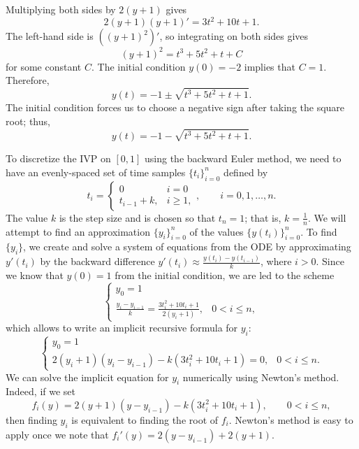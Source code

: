 \documentclass{homework}
\begin{document}
	\begin{arabicparts}
		\questionpart Multiplying both sides by $2(y+1)$ gives
		\begin{equation}
			2(y+1)(y+1)' = 3t^2+10t+1.
		\end{equation}
		The left-hand side is $\left((y+1)^2\right)'$, so integrating on both sides gives
		\begin{equation}
			(y+1)^2 = t^3+5t^2+t+C
		\end{equation}
		for some constant $C$. The initial condition $y(0) = -2$ implies that $C = 1$. Therefore,
		\begin{equation}
			y(t) = -1 \pm \sqrt{t^3+5t^2+t+1}.
		\end{equation}
		The initial condition forces us to choose a negative sign after taking the square root; thus,
		\begin{equation}
			y(t) = -1 - \sqrt{t^3+5t^2+t+1}.
		\end{equation}
		
		\questionpart To discretize the IVP on $[0,1]$ using the backward Euler method, we need to have an evenly-spaced set of time samples $\{t_i\}_{i=0}^n$ defined by
		\begin{equation}
			t_i = \begin{cases}
				0 & i = 0 \\
				t_{i-1} + k, & i \ge 1,
			\end{cases}, \qquad i = 0,1,\dots,n.
		\end{equation}
		The value $k$ is the step size and is chosen so that $t_n = 1$; that is, $k = \frac{1}{n}$. We will attempt to find an approximation $\{y_i\}_{i=0}^n$ of the values $\{y(t_i)\}_{i=0}^n$. To find $\{y_i\}$, we create and solve a system of equations from the ODE by approximating $y'(t_i)$ by the backward difference $y'(t_i) \approx \frac{y(t_i) - y(t_{i-1})}{k}$, where $i > 0$. Since we know that $y(0) = 1$ from the initial condition, we are led to the scheme
		\begin{equation}
			\begin{cases}
				y_0 = 1 &\\
				\frac{y_i - y_{i-1}}{k} = \frac{3t_i^2+10t_i + 1}{2(y_i + 1)}, & 0 < i \le n,
			\end{cases}
		\end{equation}
		which allows to write an implicit recursive formula for $y_i$:
		\begin{equation}
			\begin{cases}
				y_0 = 1 &\\
				2(y_i+1)(y_i-y_{i-1}) - k(3t_i^2+10t_i+1) = 0, & 0 < i \le n.
			\end{cases}
		\end{equation}
		We can solve the implicit equation for $y_i$ numerically using Newton's method. Indeed, if we set
		\begin{equation}
			f_i(y) = 2(y+1)(y-y_{i-1}) - k(3t_i^2+10t_i+1), \qquad 0 < i\le n,
		\end{equation}
		then finding $y_i$ is equivalent to finding the root of $f_i$. Newton's method is easy to apply once we note that $f_i'(y) = 2(y-y_{i-1}) + 2(y+1)$.
		

\end{arabicparts}
\end{document}
